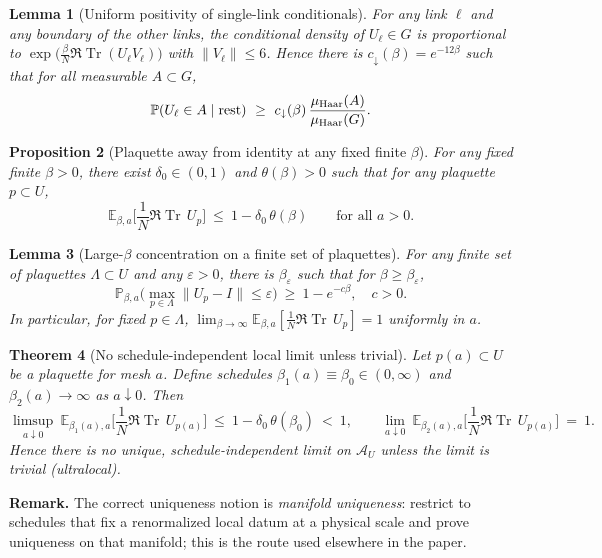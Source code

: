 \documentclass[11pt]{amsart}
\theoremstyle{plain}
\newtheorem{theorem}{Theorem}[section]
\newtheorem{lemma}[theorem]{Lemma}
\newtheorem{proposition}[theorem]{Proposition}
\theoremstyle{definition}
\theoremstyle{remark}
\DeclareMathOperator{\Tr}{Tr}
\renewcommand{\tfrac}[2]{\textstyle\frac{#1}{#2}}
\begin{document}
\begin{lemma}[Uniform positivity of single-link conditionals]\label{lem:link-minorization}
For any link $\ell$ and any boundary of the other links, the conditional density of $U_\ell\in G$ is proportional to $\exp\!\big(\tfrac{\beta}{N}\Re\Tr(U_\ell V_\ell)\big)$ with $\|V_\ell\|\le 6$. Hence there is $c_\downarrow(\beta)=e^{-12\beta}$ such that for all measurable $A\subset G$,
\[
\mathbb P(U_\ell\in A\mid \text{rest})\ \ge\ c_\downarrow(\beta)\,\frac{\mu_{\rm Haar}(A)}{\mu_{\rm Haar}(G)}.
\]
\end{lemma}

\begin{proposition}[Plaquette away from identity at any fixed finite $\beta$]\label{prop:plaq-away}
For any fixed finite $\beta>0$, there exist $\delta_0\in(0,1)$ and $\theta(\beta)>0$ such that for any plaquette $p\subset U$,
\[
\mathbb E_{\beta,a}\Big[\tfrac{1}{N}\Re\Tr\,U_p\Big]\ \le\ 1-\delta_0\,\theta(\beta)\qquad\text{for all }a>0.
\]
\end{proposition}

\begin{lemma}[Large-$\beta$ concentration on a finite set of plaquettes]\label{lem:large-beta}
For any finite set of plaquettes $\Lambda\subset U$ and any $\varepsilon>0$, there is $\beta_\varepsilon$ such that for $\beta\ge\beta_\varepsilon$,
\[
\mathbb P_{\beta,a}\Big(\max_{p\in\Lambda}\|U_p-I\|\le \varepsilon\Big)\ \ge\ 1-e^{-c\beta},\quad c>0.
\]
In particular, for fixed $p\in\Lambda$, $\lim_{\beta\to\infty}\mathbb E_{\beta,a}[\tfrac{1}{N}\Re\Tr\,U_p]=1$ uniformly in $a$.
\end{lemma}

\begin{theorem}[No schedule-independent local limit unless trivial]\label{U4D:no-go}
Let $p(a)\subset U$ be a plaquette for mesh $a$. Define schedules $\beta_1(a)\equiv\beta_0\in(0,\infty)$ and $\beta_2(a)\to\infty$ as $a\downarrow 0$. Then
\[
\limsup_{a\downarrow 0}\ \mathbb E_{\beta_1(a),a}\Big[\tfrac{1}{N}\Re\Tr\,U_{p(a)}\Big]\ \le\ 1-\delta_0\,\theta(\beta_0)\ <\ 1,
\qquad
\lim_{a\downarrow 0}\ \mathbb E_{\beta_2(a),a}\Big[\tfrac{1}{N}\Re\Tr\,U_{p(a)}\Big]\ =\ 1.
\]
Hence there is no unique, schedule-independent limit on $\mathcal A_U$ unless the limit is trivial (ultralocal).
\end{theorem}

\begin{mdframed}[linewidth=0.5pt, linecolor=blue!30, backgroundcolor=blue!3, roundcorner=2pt, innertopmargin=8pt, innerbottommargin=8pt, skipabove=10pt, skipbelow=10pt]
\noindent\textbf{Remark.} The correct uniqueness notion is \emph{manifold uniqueness}: restrict to schedules that fix a renormalized local datum at a physical scale and prove uniqueness on that manifold; this is the route used elsewhere in the paper.
\end{mdframed}
\end{document}

